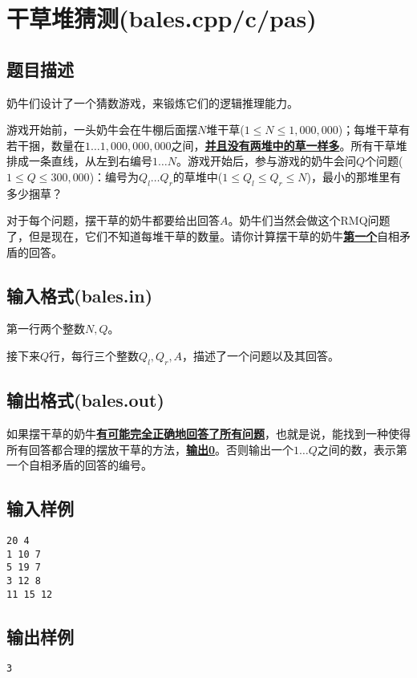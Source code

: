 \documentclass[hyperref,UTF8,12pt,a4paper]{ctexart}
\begin{document}
\newpage

\section{干草堆猜测(bales.cpp/c/pas)}

\subsection{题目描述}

奶牛们设计了一个猜数游戏，来锻炼它们的逻辑推理能力。

游戏开始前，一头奶牛会在牛棚后面摆$N$堆干草($1\le N\le1,000,000$)；每堆干草有若干捆，数量在$1\dots1,000,000,000$之间，\underline{\textbf{并且没有两堆中的草一样多}}。所有干草堆排成一条直线，从左到右编号$1\dots N$。游戏开始后，参与游戏的奶牛会问$Q$个问题($1\le Q\le300,000$)：编号为$Q_l\dots Q_r$的草堆中($1\le Q_l\le Q_r\le N$)，最小的那堆里有多少捆草？

对于每个问题，摆干草的奶牛都要给出回答$A$。奶牛们当然会做这个RMQ问题了，但是现在，它们不知道每堆干草的数量。请你计算摆干草的奶牛\underline{\textbf{第一个}}自相矛盾的回答。

\subsection{输入格式(bales.in)}

第一行两个整数$N,Q$。

接下来$Q$行，每行三个整数$Q_l,Q_r,A$，描述了一个问题以及其回答。

\subsection{输出格式(bales.out)}

如果摆干草的奶牛\underline{\textbf{有可能完全正确地回答了所有问题}}，也就是说，能找到一种使得所有回答都合理的摆放干草的方法，\underline{\textbf{输出0}}。否则输出一个$1\dots Q$之间的数，表示第一个自相矛盾的回答的编号。

\subsection{输入样例}

\begin{verbatim}
20 4
1 10 7
5 19 7
3 12 8
11 15 12
\end{verbatim}

\subsection{输出样例}
\begin{verbatim}
3
\end{verbatim}
\end{document}
